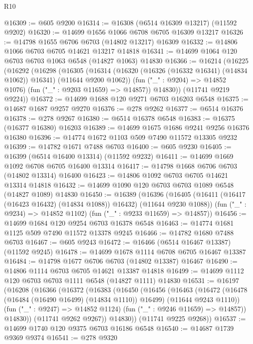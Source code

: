 \begin{lexlean}{R10}
\begin{coremodule}
{{{{{{{{{{{{{{{{{{{{{{{{{{{{{{{{{{{{{{{{{{{{{{{{{{{{{{{{{{{{{{{{{{{{{{{{{{{{{{{{{{{{@16309 := @605 @9200
@16314 := @16308 (@6514 @16309 @13217) (@11592 @9202)
@16320 := @14699 @1656 @1066 @6708 @6705 @16309 @13217
@16326 := @14798 @1655 @6706 @6703 (@14802 @13217) @16309
@16332 := @14806 @1066 @6703 @6705 @14621 @13217 @14818
@16341 := @14699 @1064 @120 @6703 @6703 @1063 @6548 (@14827 @1063) @14830
@16366 := @16214
    (@16225
      (@16292
        (@16298
          (@16305
            (@16314 (@16320 (@16326 (@16332 @16341) (@14834 @1062)) @16341) (@11644 @9200 @1062))
            (fun ("_" : @9204) => @14852 @1076)
            (fun ("_" : @9203 @11659) => @14857))
          @14830))
      (@11741 @9219 @9224))
@16372 := @14699 @1688 @120 @9271 @6703 @16203 @6548
@16375 := @14687 @1687 @9257 @9270
@16376 := @278 @9262
@16377 := @6514 @16376
@16378 := @278 @9267
@16380 := @6514 @16378 @6548
@16383 := @16375 (@16377 @16380) @16203
@16389 := @14699 @1675 @1686 @9241 @9256 @16376 @16380
@16396 := @14774 @1672 @1103 @509 @7490 @11572 @13305 @9232
@16399 := @14782 @1671 @7488 @6703
@16400 := @605 @9230
@16405 := @16399 (@6514 @16400 @13314) (@11592 @9232)
@16411 := @14699 @1669 @1092 @6708 @6705 @16400 @13314
@16417 := @14798 @1668 @6706 @6703 (@14802 @13314) @16400
@16423 := @14806 @1092 @6703 @6705 @14621 @13314 @14818
@16432 := @14699 @1090 @120 @6703 @6703 @1089 @6548 (@14827 @1089) @14830
@16450 := @16389
    (@16396
      (@16405 (@16411 (@16417 (@16423 @16432) (@14834 @1088)) @16432) (@11644 @9230 @1088))
      (fun ("_" : @9234) => @14852 @1102)
      (fun ("_" : @9233 @11659) => @14857))
@16456 := @14699 @1684 @120 @9254 @6703 @16378 @6548
@16463 := @14774 @1681 @1125 @509 @7490 @11572 @13378 @9245
@16466 := @14782 @1680 @7488 @6703
@16467 := @605 @9243
@16472 := @16466 (@6514 @16467 @13387) (@11592 @9245)
@16478 := @14699 @1678 @1114 @6708 @6705 @16467 @13387
@16484 := @14798 @1677 @6706 @6703 (@14802 @13387) @16467
@16490 := @14806 @1114 @6703 @6705 @14621 @13387 @14818
@16499 := @14699 @1112 @120 @6703 @6703 @1111 @6548 (@14827 @1111) @14830
@16531 := @16197
    (@16208
      (@16366
        (@16372
          (@16383
            (@16450
              (@16456
                (@16463
                  (@16472
                    (@16478 (@16484 (@16490 @16499) (@14834 @1110)) @16499)
                    (@11644 @9243 @1110))
                  (fun ("_" : @9247) => @14852 @1124)
                  (fun ("_" : @9246 @11659) => @14857))
                @14830))
            (@11741 @9262 @9267))
          @14830))
      (@11741 @9225 @9268))
@16537 := @14699 @1740 @120 @9375 @6703 @16186 @6548
@16540 := @14687 @1739 @9369 @9374
@16541 := @278 @9320
}}}}}}}}}}}}}}}}}}}}}}}}}}}}}}}}}}}}}}}}}}}}}}}}}}}}}}}}}}}}}}}}}}}}}}}}}}}}}}}}}}}}
\end{coremodule}
\end{lexlean}
